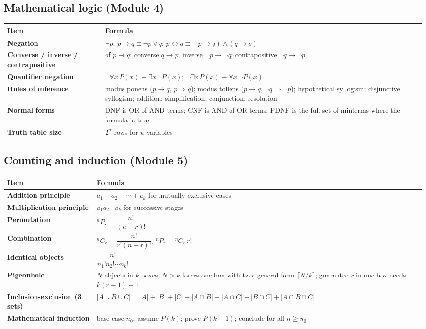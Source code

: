 \documentclass[11pt,a4paper]{article}
\begin{document}
\subsection{Mathematical logic (Module 4)}
\begin{center}\small
\begin{tabularx}{\textwidth}{>{\bfseries}p{} X}
\toprule Item & Formula\\\midrule
Negation & $\neg p$; $p\to q\equiv\neg p\lor q$; $p\leftrightarrow q\equiv(p\to q)\land(q\to p)$\\
Converse / inverse / contrapositive & of $p\to q$: converse $q\to p$; inverse $\neg p\to\neg q$; contrapositive $\neg q\to\neg p$\\
Quantifier negation & $\neg\forall x\,P(x)\equiv\exists x\,\neg P(x)$; $\neg\exists x\,P(x)\equiv\forall x\,\neg P(x)$\\
Rules of inference & modus ponens ($p\to q,\,p\Rightarrow q$); modus tollens ($p\to q,\,\neg q\Rightarrow\neg p$); hypothetical syllogism; disjunctive syllogism; addition; simplification; conjunction; resolution\\
Normal forms & DNF is OR of AND terms; CNF is AND of OR terms; PDNF is the full set of minterms where the formula is true\\
Truth table size & $2^n$ rows for $n$ variables\\\bottomrule
\end{tabularx}
\end{center}

\subsection{Counting and induction (Module 5)}
\begin{center}\small
\begin{tabularx}{\textwidth}{>{\bfseries}p{} X}
\toprule Item & Formula\\\midrule
Addition principle & $a_1+a_2+\cdots+a_k$ for mutually exclusive cases\\
Multiplication principle & $a_1a_2\cdots a_k$ for successive stages\\
Permutation & ${}^nP_r=\dfrac{n!}{(n-r)!}$\\
Combination & ${}^nC_r=\dfrac{n!}{r!(n-r)!}$, ${}^nP_r={}^nC_r\,r!$\\
Identical objects & $\dfrac{n!}{n_1!n_2!\cdots n_k!}$\\
Pigeonhole & $N$ objects in $k$ boxes, $N>k$ forces one box with two; general form $\lceil N/k\rceil$; guarantee $r$ in one box needs $k(r-1)+1$\\
Inclusion-exclusion (3 sets) & $|A\cup B\cup C|=|A|+|B|+|C|-|A\cap B|-|A\cap C|-|B\cap C|+|A\cap B\cap C|$\\
Mathematical induction & base case $n_0$; assume $P(k)$; prove $P(k+1)$; conclude for all $n\ge n_0$\\\bottomrule
\end{tabularx}
\end{center}
\end{document}
